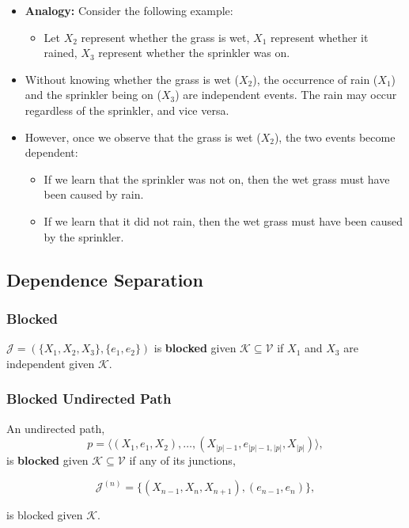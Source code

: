 \begin{notes}
    \begin{itemize}
        \item \textbf{Analogy:} Consider the following example:
        \begin{itemize}
            \item Let $X_2$ represent whether the grass is wet, $X_1$ represent whether it rained, $X_3$ represent whether the sprinkler was on.
        \end{itemize}
        \item Without knowing whether the grass is wet ($X_2$), the occurrence of rain ($X_1$) and the sprinkler being on ($X_3$) are independent events. The rain may occur regardless of the sprinkler, and vice versa.
        \item However, once we observe that the grass is wet ($X_2$), the two events become dependent:
        \begin{itemize}
            \item If we learn that the sprinkler was not on, then the wet grass must have been caused by rain.
            \item If we learn that it did not rain, then the wet grass must have been caused by the sprinkler.
        \end{itemize}
    \end{itemize}
\end{notes}
\newpage

\subsection{Dependence Separation}
\subsubsection{Blocked}
\begin{definition}
    $\mathcal{J} = (\{X_1, X_2, X_3\}, \{e_1, e_2\})$ is \textbf{blocked} given $\mathcal{K} \subseteq \mathcal{V}$ if $X_1$ and $X_3$ are independent given $\mathcal{K}$.
\end{definition}

\subsubsection{Blocked Undirected Path}
\begin{definition}
    An undirected path,
    \[
    p = \langle (X_1, e_1, X_2), \dots, (X_{|p|-1}, e_{|p|-1,|p|}, X_{|p|}) \rangle,
    \]
    is \textbf{blocked} given $\mathcal{K} \subseteq \mathcal{V}$ if any of its junctions,

    \[
    \mathcal{J}^{(n)} = \{(X_{n-1}, X_n, X_{n+1}), (e_{n-1}, e_n)\},
    \]

    is blocked given $\mathcal{K}$.
\end{definition}

